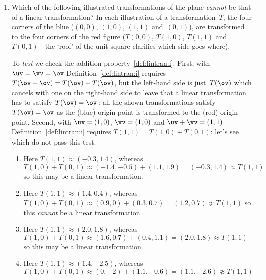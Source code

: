 \begin{example}
\begin{enumerate}
\item\label{eg:LTtwoDg} Which of the following illustrated transformations of the plane \emph{cannot} be that of a linear transformation?
In each illustration of a transformation~\(T\), the four corners of the blue  (\((0,0)\), \((1,0)\), \((1,1)\) and~\((0,1)\)), are transformed to the four corners of the red figure (\(T(0,0)\), \(T(1,0)\), \(T(1,1)\) and~\(T(0,1)\)---the `roof' of the unit square clarifies which side goes where).
\begin{solution} 
To \emph{test} we check the addition property~\ref{def:lintran:i}.
First, with \(\uv=\vv=\ov\) Definition~\ref{def:lintran:i} requires \(T(\ov+\ov)=T(\ov)+T(\ov)\), but the left-hand side is just~\(T(\ov)\) which cancels with one on the right-hand side to leave that a linear transformation has to satisfy \(T(\ov)=\ov\)\,: all the shown transformations satisfy \(T(\ov)=\ov\) as the (blue) origin point is transformed to the (red) origin point.
Second, with \(\uv=(1,0)\), \(\vv=(1,0)\) and \(\uv+\vv=(1,1)\) Definition~\ref{def:lintran:i} requires \(T(1,1)=T(1,0)+T(0,1)\): let's see which do not pass this test.
\begin{enumerate}
\item Here \(T(1,1)\approx(-0.3,1.4)\), whereas
\(T(1,0)+T(0,1)\approx (-1.4,-0.5)+(1.1,1.9)
=(-0.3,1.4)\approx T(1,1)\) 
so this may be a linear transformation.
\item Here \(T(1,1)\approx(1.4,0.4)\), whereas
\(T(1,0)+T(0,1)\approx (0.9,0)+(0.3,0.7)
=(1.2,0.7)\not\approx T(1,1)\) 
so this \emph{cannot} be a linear transformation.
\item Here \(T(1,1)\approx(2.0,1.8)\), whereas
\(T(1,0)+T(0,1)\approx (1.6,0.7)+(0.4,1.1)
=(2.0,1.8)\approx T(1,1)\) 
so this may be a linear transformation.
\item Here \(T(1,1)\approx(1.4,-2.5)\), whereas
\(T(1,0)+T(0,1)\approx (0,-2)+(1.1,-0.6)
=(1.1,-2.6)\not\approx T(1,1)\) 

\end{enumerate}
\end{solution}
\end{enumerate}
\end{example}
